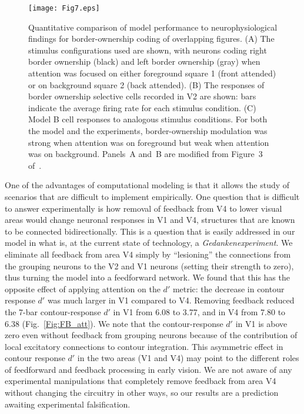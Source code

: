 \begin{figure*}
\begin{center}
\texttt{[image: Fig7.eps]}
\end{center}
\caption{Quantitative comparison of model performance to
  neurophysiological findings \citep{Qiu_etal07} for border-ownership coding of
  overlapping figures. (A) The stimulus configurations used are shown,
  with neurons coding right border ownership (black) and left border
  ownership (gray) when attention was focused on either foreground
  square 1 (front attended) or on background square 2 (back
  attended). (B) The responses of border ownership selective cells
  recorded in V2 are shown:  bars indicate the
  average firing rate 
  for each stimulus condition. (C) Model B cell responses to analogous
  stimulus conditions. For both the model and the experiments,
  border-ownership modulation was strong when attention was on
  foreground but weak when attention was on background. %
Panels~A and~B are modified from Figure~3 of~\cite{Qiu_etal07}.} 
\label{Fig:Overlap_Square_exp_model}
\end{figure*}

One of the advantages of computational modeling is that it allows the
study of scenarios that are difficult to implement empirically.
One question that is difficult to answer experimentally is how removal of
feedback 
from V4 to lower visual areas
%
would change neuronal responses in V1 and V4, structures that
are known to be connected bidirectionally. This is a question that is
easily addressed in our model in what is, at the current state of
technology, a {\em Gedankenexperiment}. We eliminate all feedback from area
V4  simply by ``lesioning'' the 
connections from the grouping neurons to the V2 and V1 neurons
(setting their strength to zero), thus turning the model into a
feedforward network.  We found that this has the opposite effect of
applying attention on the $d'$ metric: the decrease in contour
response $d'$ was much larger in V1 compared to V4. Removing feedback
reduced the 7-bar contour-response $d'$ in V1 from 6.08 to 3.77, and
in V4 from 7.80 to 6.38 (Fig.~\ref{Fig:FB_att}). We note that the
contour-response $d'$ in V1 is above zero even without feedback from
grouping neurons because of the contribution of local
excitatory connections to contour integration.
This asymmetric
effect in contour response $d'$ in the two areas (V1 and V4) may point
to the different roles of feedforward and feedback processing in early
vision. We are not aware of any experimental manipulations that completely
remove feedback from area V4 without changing the circuitry in other
ways, so our results are a prediction awaiting experimental
falsification.

